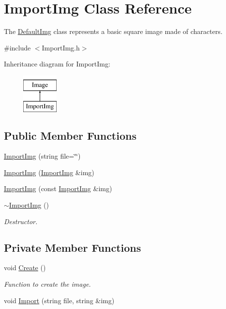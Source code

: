 \hypertarget{classImportImg}{\section{Import\-Img Class Reference}
\label{classImportImg}
}


The \hyperlink{classDefaultImg}{Default\-Img} class represents a basic square image made of characters.  




{\ttfamily \#include $<$Import\-Img.\-h$>$}

Inheritance diagram for Import\-Img\-:\begin{figure}[H]
\begin{center}
\leavevmode
\includegraphics[height=2.000000cm]{classImportImg}
\end{center}
\end{figure}
\subsection*{Public Member Functions}
\begin{DoxyCompactItemize}
\item 
\hyperlink{classImportImg_a888292aaf716935b9e6baddea62af5d8}{Import\-Img} (string file=\char`\"{}\char`\"{})
\item 
\hyperlink{classImportImg_a42a6d3113dfaa5c94fb43360d1641b6f}{Import\-Img} (\hyperlink{classImportImg}{Import\-Img} \&img)
\item 
\hyperlink{classImportImg_adfc26e250764e4388d9aee048a22a673}{Import\-Img} (const \hyperlink{classImportImg}{Import\-Img} \&img)
\item 
\hyperlink{classImportImg_a5b0782a45e30d935067919e69169e809}{$\sim$\-Import\-Img} ()
\begin{DoxyCompactList}\small\item\em Destructor. \end{DoxyCompactList}\end{DoxyCompactItemize}
\subsection*{Private Member Functions}
\begin{DoxyCompactItemize}
\item 
void \hyperlink{classImportImg_a7e1cc1bf176cedb14938519950719fa2}{Create} ()
\begin{DoxyCompactList}\small\item\em Function to create the image. \end{DoxyCompactList}\item 
void \hyperlink{classImportImg_a20bf0509a73e9c08e89518a2ea9a868a}{Import} (string file, string \&img)
\end{DoxyCompactItemize}
